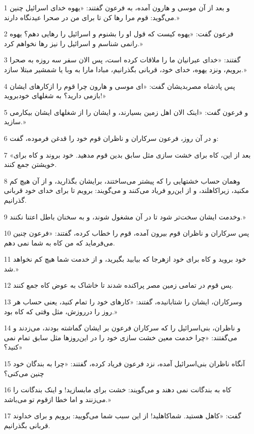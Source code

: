 \par 1 و بعد از آن موسی و هارون آمده، به فرعون گفتند: «یهوه خدای اسرائیل چنین می‌گوید: قوم مرا رها کن تا برای من در صحرا عیدنگاه دارند.»
\par 2 فرعون گفت: «یهوه کیست که قول او را بشنوم و اسرائیل را رهایی دهم؟ یهوه رانمی شناسم و اسرائیل را نیز رها نخواهم کرد.»
\par 3 گفتند: «خدای عبرانیان ما را ملاقات کرده است، پس الان سفر سه روزه به صحرا برویم، ونزد یهوه، خدای خود، قربانی بگذرانیم، مبادا مارا به وبا یا شمشیر مبتلا سازد.»
\par 4 پس پادشاه مصربدیشان گفت: «ای موسی و هارون چرا قوم را ازکارهای ایشان بازمی دارید؟ به شغلهای خودبروید!»
\par 5 و فرعون گفت: «اینک الان اهل زمین بسیارند، و ایشان را از شغلهای ایشان بیکارمی سازید.»
\par 6 و در آن روز، فرعون سرکاران و ناظران قوم خود را قدغن فرموده، گفت:
\par 7 «بعد از این، کاه برای خشت سازی مثل سابق بدین قوم مدهید. خود بروند و کاه برای خویشتن جمع کنند.
\par 8 وهمان حساب خشتهایی را که پیشتر می‌ساختند، برایشان بگذارید، و از آن هیچ کم مکنید، زیراکاهلند، و از این‌رو فریاد می‌کنند و می‌گویند: برویم تا برای خدای خود قربانی گذرانیم.
\par 9 وخدمت ایشان سخت‌تر شود تا در آن مشغول شوند، و به سخنان باطل اعتنا نکنند.»
\par 10 پس سرکاران و ناظران قوم بیرون آمده، قوم را خطاب کرده، گفتند: «فرعون چنین می‌فرماید که من کاه به شما نمی دهم.
\par 11 خود بروید و کاه برای خود ازهرجا که بیابید بگیرید، و از خدمت شما هیچ کم نخواهد شد.»
\par 12 پس قوم در تمامی زمین مصر پراکنده شدند تا خاشاک به عوض کاه جمع کنند.
\par 13 وسرکاران، ایشان را شتابانیده، گفتند: «کارهای خود را تمام کنید، یعنی حساب هر روز را درروزش، مثل وقتی که کاه بود.»
\par 14 و ناظران، بنی‌اسرائیل را که سرکاران فرعون بر ایشان گماشته بودند، می‌زدند و می‌گفتند: «چرا خدمت معین خشت سازی خود را در این‌روزها مثل سابق تمام نمی کنید؟»
\par 15 آنگاه ناظران بنی‌اسرائیل آمده، نزد فرعون فریاد کرده، گفتند: «چرا به بندگان خود چنین می‌کنی؟
\par 16 کاه به بندگانت نمی دهند و می‌گویند: خشت برای مابسازید! و اینک بندگانت را می‌زنند و اما خطا ازقوم تو می‌باشد.»
\par 17 گفت: «کاهل هستید. شماکاهلید! از این سبب شما می‌گویید: برویم و برای خداوند قربانی بگذرانیم.
